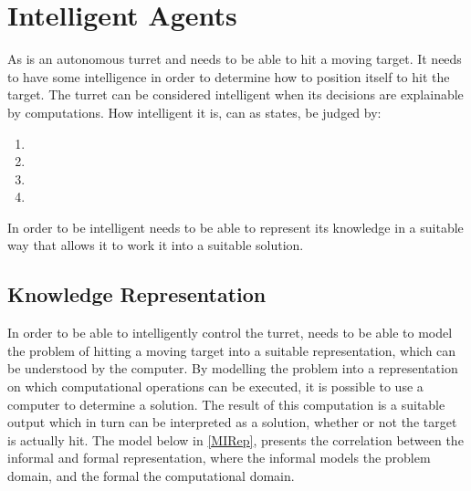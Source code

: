 \section{Intelligent Agents}
 
As \name is an autonomous turret and needs to be able to hit a moving target.
It needs to have some intelligence in order to determine how to position itself
to hit the target. The turret can be considered intelligent when its decisions
are explainable by computations. How intelligent it is, can as
\citep[ch.1.1,p.4]{MIBook} states, be judged by:

\begin{enumerate}
  
  \item {}
  \item {}
  \item {}
  \item {}
\end{enumerate}

In order to be intelligent \name needs to be able to represent its
knowledge in a suitable way that allows it to work it into a suitable solution. 

\subsection{Knowledge Representation}\label{KR}

In order to be able to intelligently control the turret, \name needs to be able
to model the problem of hitting a moving target into a suitable representation,
which can be understood by the computer. By modelling the problem into a
representation on which computational operations can be executed, it is possible
to use a computer to determine a solution. The result of this computation is a
suitable output which in turn can be interpreted as a solution, whether or not
the target is actually hit. The model below in \autoref{MIRep}, presents the
correlation between the informal and formal representation, where the informal
models the problem domain, and the formal the computational domain.


